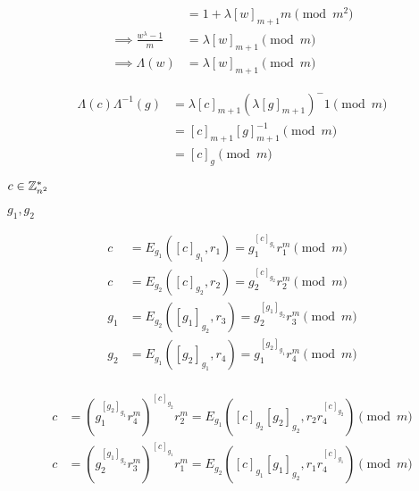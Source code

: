 \documentclass[10pt]{book}
\begin{document}
\begin{mdSnippets}
\begin{mdDisplaySnippet}
\[\begin{aligned}
  &= 1 + \lambda[w]_{m+1}m \pmod{m^2} \\
  \implies \frac{w^{\lambda} - 1}{m} &= \lambda[w]_{m+1} \pmod m \\
  \implies \Lambda(w) &= \lambda[w]_{m+1} \pmod m 
\end{aligned} 
\]%
\end{mdDisplaySnippet}%
\begin{mdDisplaySnippet}[03eada3f015d9cf4e14b51f3e887f100]%
\[%
\begin{aligned}
\Lambda(c)\Lambda^{-1}(g) &=  \lambda[c]_{m+1} (\lambda [g]_{m+1})^-1 \pmod m\\
&= [c]_{m+1}[g]_{m+1}^{-1}\pmod m \\
&= [c]_g \pmod m
\end{aligned}
\]%
\end{mdDisplaySnippet}%
\begin{mdInlineSnippet}[7af1a6c80d49fa1096759656810b2443]%
$c \in \mathbb{Z}_{n^2}^*$\end{mdInlineSnippet}%
\begin{mdInlineSnippet}[b3c11d4d14dfbaa3bd8487557951be95]%
$g_1,g_2$\end{mdInlineSnippet}%
\begin{mdDisplaySnippet}[0579c7e47c83efb49e11e53e3fb3080c]%
\[%
\begin{aligned}
  c &= E_{g_1}([c]_{g_1},r_1) = g_1^{[c]_{g_1}}r_1^m \pmod m \\
  c &= E_{g_2}([c]_{g_2},r_2) = g_2^{[c]_{g_2}}r_2^m \pmod m\\
  g_1 &= E_{g_2}([g_1]_{g_2},r_3) = g_2^{[g_1]_{g_2}}r_3^m \pmod m\\
  g_2 &= E_{g_1}([g_2]_{g_1},r_4) = g_1^{[g_2]_{g_1}}r_4^m \pmod m\\
\end{aligned}
\]%
\end{mdDisplaySnippet}%
\begin{mdDisplaySnippet}[cf369d9476ebea52b7586bd8436f379c]%
\[%
\begin{aligned}
  c &= (g_1^{[g_2]_{g_1}}r_4^m)^{[c]_{g_2}}r_2^m = E_{g_1}([c]_{g_2}[g_2]_{g_2}, r_2r_4^{[c]_{g_2}}) \pmod m\\
  c &= (g_2^{[g_1]_{g_2}}r_3^m)^{[c]_{g_1}}r_1^m = E_{g_2}([c]_{g_1}[g_1]_{g_2}, r_1r_4^{[c]_{g_1}}) \pmod  m
\end{aligned}
\]%

\end{mdDisplaySnippet}
\end{mdSnippets}
\end{document}
